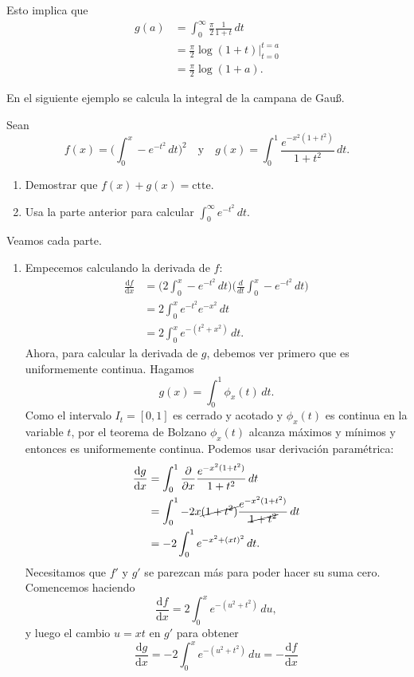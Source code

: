 \documentclass[mid,fleqn,draft,twoside]{notasdeclase}
\newcommand{\inte}[4]{\int_{#1}^{#2} #3\, d#4}
\newcommand{\pd}[1]{\frac{\partial}{\partial #1}}
\newcommand{\der}[1]{\frac{d}{d#1}}
\begin{document}
\begin{ejem}
	 Esto implica que
	 \begin{align*}
	 	g(a) &= \inte{0}{\infty}{\frac{\pi}{2}\frac{1}{1+t}}{t} \\
	 		 &= \frac{\pi}{2}\log(1+t)\bigg|_{t=0}^{t=a} \\
	 		 &= \frac{\pi}{2}\log(1+a).
	 \end{align*}
\end{ejem}
En el siguiente ejemplo se calcula la integral de la campana de Gau{\ss}.
\begin{ejem}
	Sean
	\[ f(x)=\bigg(\inte{0}{x}{-e^{-t^2}}{t}\bigg)^2\quad\text{y}\quad g(x)=\inte{0}{1}{\frac{e^{-x^2(1+t^2)}}{1+t^2}}{t}. \]
	\begin{enumerate}
		\item Demostrar que $f(x)+g(x)=\text{ctte}$.
		\item Usa la parte anterior para calcular $\inte{0}{\infty}{e^{-t^2}}{t}.$
	\end{enumerate}
	Veamos cada parte.
	\begin{enumerate}
		\item Empecemos calculando la derivada de $f$:
		\begin{align*}
			\frac{\mathrm df}{\mathrm dx} &=\bigg(2\inte{0}{x}{-e^{-t^2}}{t}\bigg)\bigg(\der{t}\inte{0}{x}{-e^{-t^2}}{t}\bigg) \\
			&= 2\inte{0}{x}{e^{-t^2}e^{-x^2}}{t} \\
			&=2\inte{0}{x}{e^{-(t^2+x^2)}}{t}.
		\end{align*}
		Ahora, para calcular la derivada de $g$, debemos ver primero que es uniformemente continua. Hagamos
		\[ g(x)=\inte{0}{1}{\phi_x(t)}{t}. \] 
		Como el intervalo $I_t=[0,1]$ es cerrado y acotado y $\phi_x(t)$ es continua en la variable $t$, por el teorema de Bolzano $\phi_x(t)$ alcanza máximos y mínimos y entonces es uniformemente continua. Podemos usar derivación paramétrica:
		\begin{align*}
			\frac{\mathrm dg}{\mathrm dx} &= \inte{0}{1}{\pd{x}\frac{e^{-x^2(1+t^2)}}{1+t^2}}{t} \\
										  &= \inte{0}{1}{-2x\cancel{(1+t^2)}\frac{e^{-x^2(1+t^2)}}{\cancel{1+t^2}}}{t} \\
										  &= -2\inte{0}{1}{e^{-x^2+(xt)^2}}{t}.
		\end{align*}
		Necesitamos que $f'$ y $g'$ se parezcan más para poder hacer su suma cero. Comencemos haciendo
		\[ \frac{\mathrm df}{\mathrm dx} = 2\inte{0}{x}{e^{-(u^2+t^2)}}{u}, \]
		y luego el cambio $u=xt$ en $g'$ para obtener
		\[ \frac{\mathrm dg}{\mathrm dx} = -2\inte{0}{x}{e^{-(u^2+t^2)}}{u} = -\frac{\mathrm df}{\mathrm dx}\]

\end{enumerate}
\end{ejem}
\end{document}
